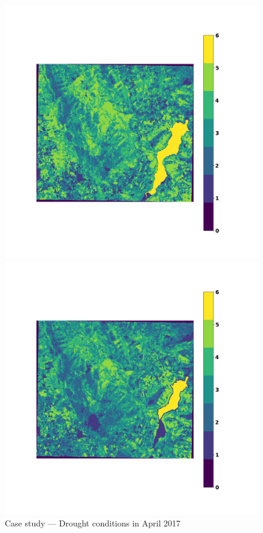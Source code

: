\documentclass[10pt,twocolumn]{article}
\begin{document}
\begin{figure}[h]
  \centering

  \begin{minipage}{1\columnwidth}
      \centering
      \includegraphics[width=\textwidth]{images/results/april/case/Riserva naturale Pizzo Cane, Pizzo Trigna, Grotta Mazzamuto_K=6+1_2017_april.png}
      \caption{Case study — Drought conditions in April 2017}
      \label{fig:case_april_lr_2017}
  \end{minipage}
  \hfill
  \begin{minipage}{1\columnwidth}
      \centering
      \includegraphics[width=\textwidth]{images/results/april/case/Riserva naturale Pizzo Cane, Pizzo Trigna, Grotta Mazzamuto_K=6+1_2024_april.png}

\end{minipage}
\end{figure}
\end{document}
